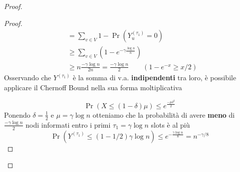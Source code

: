 \begin{teorema}
\begin{proof}
\begin{description}
\begin{lemma}
\begin{proof}
\begin{align*}
                        &= \sum_{v \in V} 1 - \Pr(Y^{(\tau_1)}_u = 0) \\
                        &\geq \sum_{v \in V} \left(1 - e^{-\gamma\frac{\log n}{n}}\right) \\
                        &\geq n \frac{-\gamma \log n}{2n} = \frac{-\gamma \log n}{2} \qquad (1 - e^{-x} \geq x/2)
                    \end{align*}
                    Osservando che $Y^{(\tau_1)}$ è la somma di v.a. \textbf{indipendenti} tra loro, è possibile applicare il Chernoff Bound nella sua forma moltiplicativa
                    
                    \[
                        \Pr(X \leq (1 - \delta)\mu) \leq e^{\frac{-\mu\delta^2}{2}}
                    \]
                    Ponendo $\delta = \frac{1}{2}$ e $\mu = \gamma \log n$ otteniamo che la probabilità di avere \textbf{meno} di $\frac{-\gamma \log n}{2}$ nodi informati entro i primi $\tau_1 = \gamma \log n$ slots è al più
                    \[
                        \Pr \left( Y^{(\tau_1)} \leq (1 - 1/2)\gamma\log n \right) \leq e^{-\frac{\gamma \log n}{8}} = n^{-\gamma/8}
                    \]
                    

\end{proof}
\end{lemma}
\end{description}
\end{proof}
\end{teorema}

